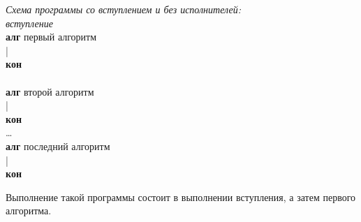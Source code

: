 \documentclass[12pt,a4paper]{article}
\begin{document}
\emph{Схема программы со вступлением и без исполнителей:}
{\sffamily\\
\textit{вступление}\\
\textbf{алг} первый алгоритм\\
|\\
\textbf{кон}\\
~\\
\textbf{алг} второй алгоритм\\
|\\
\textbf{кон}\\
\dots\\
\textbf{алг} последний алгоритм\\
|\\
\textbf{кон}
}

Выполнение такой программы состоит в выполнении вступления, а затем первого алгоритма.
\end{document}
